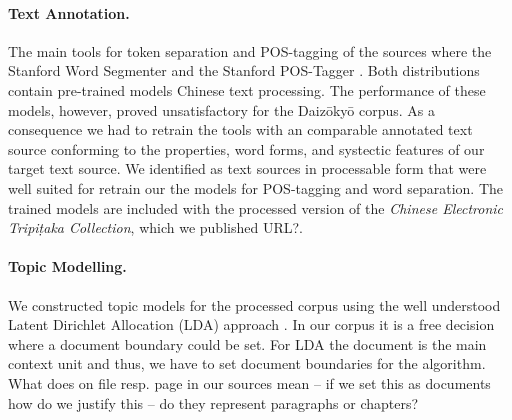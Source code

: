 \documentclass[a4paper,10pt]{article}
\newcommand{\TODO}[1]{\begingroup\color{red}#1\endgroup}
\begin{document}
\paragraph{Text Annotation.} 
The main tools for token separation and POS-tagging of the sources where
the Stanford Word Segmenter and the Stanford POS-Tagger
\cite{manning:2014}.  Both distributions contain pre-trained models Chinese
text processing. The performance of these models, however, proved
unsatisfactory for the Daiz{\=o}ky{\=o} corpus. As a consequence we had to
retrain the tools with an comparable annotated text source conforming to
the properties, word forms, and \TODO{systectic} features of our target
text source.  We identified  as text
sources in processable form that were well suited for retrain our the
models for POS-tagging and word separation. The trained models are included
with the processed version of the \textit{Chinese Electronic
  Tripi{\d{t}}aka Collection}, which we published \TODO{URL?}.

\paragraph{Topic Modelling.}
  We constructed topic models for the processed corpus using the well
  understood Latent Dirichlet Allocation (LDA) approach 
  \cite{blei:2012,griffiths:2004}. In our corpus it is a free decision where 
  a document boundary could be set.  For LDA the document is the main context 
  unit and thus, we have to set document boundaries for the algorithm. 
  \TODO{What does on file resp. page in our sources mean -- if we set this as 
  documents how do we justify this -- do they represent paragraphs or chapters?}
\end{document}
